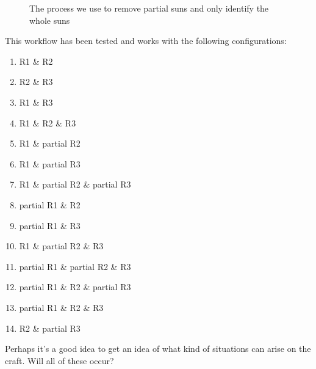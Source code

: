 \documentclass[10pt]{scrartcl}
\begin{document}
\begin{figure}[!ht]
    {\caption{The process we use to remove partial suns and only identify the whole suns}\label{fixtheregion}}%
\end{figure}


This workflow has been tested and works with the following configurations:
\begin{enumerate}
    \item R1 \& R2
    \item R2 \& R3
    \item R1 \& R3
    \item R1 \& R2 \& R3
    \item R1 \& partial R2
    \item R1 \& partial R3
    \item R1 \& partial R2 \& partial R3
    \item partial R1 \& R2
    \item partial R1 \& R3
    \item R1 \& partial R2 \& R3
    \item partial R1 \& partial R2 \& R3
    \item partial R1 \& R2 \& partial R3
    \item partial R1 \& R2 \& R3
    \item R2 \& partial R3
\end{enumerate}



Perhaps it's a good idea to get an idea of what kind of situations can arise on the craft. Will all of these occur?


\end{document}
